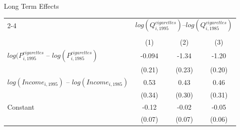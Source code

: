 \documentclass[notes,10pt, aspectratio=169]{beamer}
\begin{document}
\begin{frame}{Long Term Effects}
\begin{table}[]
\begin{tabular}{l|ccc|}
\cline{2-4}
                                                                                                                               & \multicolumn{3}{c|}{ {$log(Q^{cigarettes}_{i,1995})$--$log(Q^{cigarettes}_{i,1985})$}} \\
                                                                                                                               & \multicolumn{3}{c|}{ } \\
                                                                                                                               & (1)                                        & (2)                                                     & (3)                                     \\ \hline
\multicolumn{1}{|l|}{$log(P^{cigarettes}_{i,  1995}$ -- $log(P^{cigarettes}_{i,  1985})$} & -0.094                                     & -1.34                                                   & -1.20                                   \\
\multicolumn{1}{|l|}{}                                                                                                         & (0.21)                                     & (0.23)                                                  & (0.20)                                  \\
\multicolumn{1}{|l|}{$log(Income_{i,  1995})$ -- $log(Income_{i,  1985})$}                                                      & 0.53                                       & 0.43                                                    & 0.46                                    \\
\multicolumn{1}{|l|}{}                                                                                                         & (0.34)                                     & (0.30)                                                  & (0.31)                                  \\
\multicolumn{1}{|l|}{Constant}                                                                                                 & -0.12                                      & -0.02                                                   & -0.05                                   \\
\multicolumn{1}{|l|}{}                                                                                                         & (0.07)                                     & (0.07)                                                  & (0.06)                                  \\ \hline

\end{tabular}
\end{table}
\end{frame}
\end{document}
